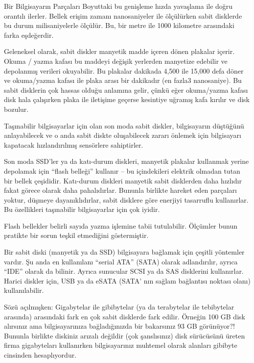 \begin{section}{Bir Bilgisayarın Parçaları}
Boyuttaki bu genişleme hızda yavaşlama ile doğru orantılı ilerler. Bellek erişim zamanı nanosaniyeler ile ölçülürken sabit disklerde bu durum milisaniyelerle ölçülür. Bu, bir metre ile 1000 kilometre arasındaki farka eşdeğerdir.

Geleneksel olarak, sabit diskler manyetik madde içeren dönen plakalar içerir. Okuma / yazma kafası bu maddeyi değişik yerlerden manyetize edebilir ve depolanmış verileri okuyabilir. Bu plakalar dakikada 4,500 ile 15,000 defa döner ve okuma/yazma kafası ile plaka arası bir dakikadır (en fazla3 nanosaniye). Bu sabit disklerin çok hassas olduğu anlamına gelir, çünkü eğer okuma/yazma kafası disk hala çalışırken plaka ile iletişime geçerse kesintiye uğramış kafa kırılır ve disk bozulur.

Taşınabilir bilgisayarlar için olan son moda sabit diskler, bilgisayarın düştüğünü anlayabilecek ve o anda sabit diskte oluşabilecek zararı önlemek için bilgisayarı kapatacak hızlandırılmış sensörlere sahiptirler.

Son moda SSD'ler ya da katı-durum diskleri, manyetik plakalar kullanmak yerine depolamak için “flash belleği” kullanır – bu içindekileri elektrik olmadan tutan bir bellek çeşididir. Katı-durum diskleri manyetik sabit disklerden daha hızlıdır fakat görece olarak daha pahalıdırlar. Bununla birlikte hareket eden parçaları yoktur, düşmeye dayanıklıdırlar, sabit disklere göre enerjiyi tasarruflu kullanırlar. Bu özellikleri taşınabilir bilgisayarlar için çok iyidir.

Flash bellekler belirli sayıda yazma işlemine tabii tutulabilir. Ölçümler bunun pratikte bir sorun teşkil etmediğini göstermiştir.

Bir sabit diski (manyetik ya da SSD) bilgisayara bağlamak için çeşitli yöntemler vardır. Şu anda en kullanılanı “serial ATA” (SATA) olarak adlandırılır, ayrıca “IDE” olarak da bilinir. Ayrıca sunucular SCSI ya da SAS disklerini kullanırlar. Harici diskler için, USB ya da eSATA (SATA' nın sağlam bağlantısı noktası olanı) kullanılabilir.

Sözü açılmışken: Gigabytelar ile gibibytelar (ya da terabytelar ile tebibytelar arasında) arasındaki fark en çok sabit disklerde fark edilir. Örneğin 100 GB disk alırsınız ama bilgisayarınıza bağladığınızda bir bakarsınız 93 GB görünüyor?! Bununla birlikte diskiniz arızalı değildir (çok şanslısınız) disk sürücüsünü üreten firma gigabyteları kullanırken bilgisayarınız muhtemel olarak alanları gibibyte cinsinden hesaplıyordur.

\end{section}
